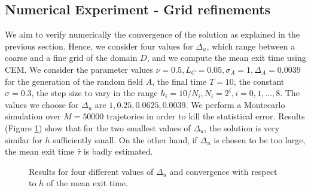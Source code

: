 \subsection{Numerical Experiment - Grid refinements}

We aim to verify numerically the convergence of the solution as explained in the previous section. Hence, we consider four values for $\Delta_u$, which range between a coarse and a fine grid of the domain $D$, and we compute the mean exit time using CEM. We consider the parameter values $\nu = 0.5, L_C = 0.05, \sigma_A = 1, \Delta_A = 0.0039$ for the generation of the random field $A$, the final time $T = 10$, the constant $\sigma = 0.3$, the step size to vary in the range $h_i = 10 / N_i, N_i = 2^i, i = 0, 1, \dots, 8$. The values we choose for $\Delta_u$ are $1, 0.25, 0.0625, 0.0039$. We perform a Montecarlo simulation over $M  = 50000$ trajetories in order to kill the statistical error. Results (Figure \ref{fig:ConvDeltau}) show that for the two smallest values of $\Delta_u$, the solution is very similar for $h$ sufficiently small. On the other hand, if $\Delta_u$ is chosen to be too large, the mean exit time $\bar \tau$ is badly estimated.

\begin{figure}[t]
    \centering
    \resizebox{0.6\linewidth}{!}{ }  
    \caption{Results for four different values of $\Delta_u$ and convergence with respect to $h$ of the mean exit time.}
    \label{fig:ConvDeltau}
\end{figure}
